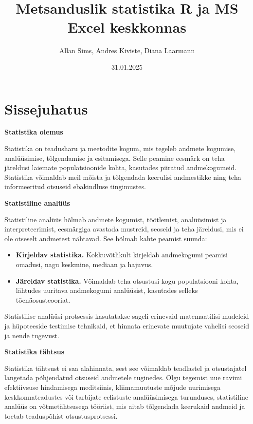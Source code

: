 \documentclass[
]{book}
\title{Metsanduslik statistika R ja MS Excel keskkonnas}
\author{Allan Sims, Andres Kiviste, Diana Laarmann}
\date{31.01.2025}
\providecommand{\tightlist}{%
  \setlength{\itemsep}{0pt}\setlength{\parskip}{0pt}}
\begin{document}
\maketitle

{
\setcounter{tocdepth}{1}
\tableofcontents
}
\chapter{Sissejuhatus}\label{sissejuhatus}

\textbf{Statistika olemus}

Statistika on teadusharu ja meetodite kogum, mis tegeleb andmete kogumise, analüüsimise, tõlgendamise ja esitamisega. Selle peamine eesmärk on teha järeldusi laiemate populatsioonide kohta, kasutades piiratud andmekogumeid. Statistika võimaldab meil mõista ja tõlgendada keerulisi andmestikke ning teha informeeritud otsuseid ebakindluse tingimustes.

\textbf{Statistiline analüüs}

Statistiline analüüs hõlmab andmete kogumist, töötlemist, analüüsimist ja interpreteerimist, eesmärgiga avastada mustreid, seoseid ja teha järeldusi, mis ei ole otseselt andmetest nähtavad. See hõlmab kahte peamist suunda:

\begin{itemize}
\tightlist
\item
  \textbf{Kirjeldav statistika.} Kokkuvõtlikult kirjeldab andmekogumi peamisi omadusi, nagu keskmine, mediaan ja hajuvus.
\item
  \textbf{Järeldav statistika.} Võimaldab teha otsustusi kogu populatsiooni kohta, lähtudes uuritava andmekogumi analüüsist, kasutades selleks tõenäosusteooriat.
\end{itemize}

Statistilise analüüsi protsessis kasutatakse sageli erinevaid matemaatilisi mudeleid ja hüpoteeside testimise tehnikaid, et hinnata erinevate muutujate vahelisi seoseid ja nende tugevust.

\textbf{Statistika tähtsus}

Statistika tähtsust ei saa alahinnata, sest see võimaldab teadlastel ja otsustajatel langetada põhjendatud otsuseid andmetele tuginedes. Olgu tegemist uue ravimi efektiivsuse hindamisega meditsiinis, kliimamuutuste mõjude uurimisega keskkonnateadustes või tarbijate eelistuste analüüsimisega turunduses, statistiline analüüs on võtmetähtsusega tööriist, mis aitab tõlgendada keerukaid andmeid ja toetab teaduspõhist otsustusprotsessi.
\end{document}

